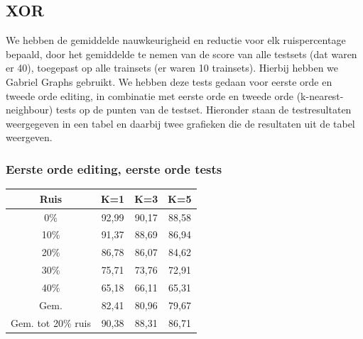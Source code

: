 \documentclass{article}
\begin{document}
\subsection{XOR}
We hebben de gemiddelde nauwkeurigheid en reductie voor elk ruispercentage bepaald, door het gemiddelde te nemen van de score van alle testsets (dat waren er 40), toegepast op alle trainsets (er waren 10 trainsets). Hierbij hebben we Gabriel Graphs gebruikt. We hebben deze tests gedaan voor eerste orde en tweede orde editing, in combinatie met eerste orde en tweede orde (k-nearest-neighbour) tests op de punten van de testset. Hieronder staan de testresultaten weergegeven in een tabel en daarbij twee grafieken die de resultaten uit de tabel weergeven.

\subsubsection{Eerste orde editing, eerste orde tests}
\begin{tabular}{|c|c|c|c|} \hline
Ruis & K=1 & K=3 & K=5 \\ \hline
0\% &	92,99 &	90,17 &	88,58 \\
10\% &	91,37 &	88,69 &	86,94 \\
20\% &	86,78 &	86,07 &	84,62 \\
30\% &	75,71 &	73,76 &	72,91 \\
40\% &	65,18 &	66,11 &	65,31 \\
Gem.	& 82,41 &	80,96 &	79,67 \\
Gem. tot 20\%  ruis &	90,38 &	88,31 &	86,71 \\ \hline
\end{tabular} \\
\end{document}
